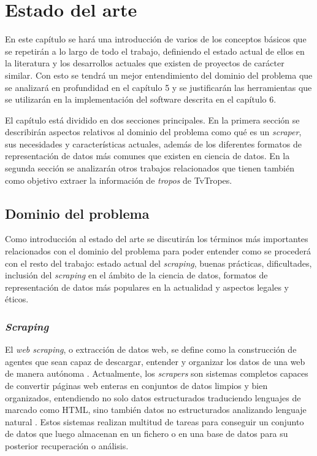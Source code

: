 \chapter{Estado del arte}
\label{chapter:3}

En este capítulo se hará una introducción de varios de los conceptos básicos que
se repetirán a lo largo de todo el trabajo, definiendo el estado actual de ellos
en la literatura y los desarrollos actuales que existen de proyectos de carácter
similar. Con esto se tendrá un mejor entendimiento del dominio del problema que
se analizará en profundidad en el capítulo 5 y se justificarán las herramientas
que se utilizarán en la implementación del software descrita en el capítulo 6.

El capítulo está dividido en dos secciones principales. En la primera sección se
describirán aspectos relativos al dominio del problema como qué es un
\textit{scraper}, sus necesidades y características actuales, además de los
diferentes formatos de representación de datos más comunes que existen en
ciencia de datos. En la segunda sección se analizarán otros trabajos
relacionados que tienen también como objetivo extraer la información de
\textit{tropos} de TvTropes. 

\section{Dominio del problema}
Como introducción al estado del arte se discutirán los términos más importantes
relacionados con el dominio del problema para poder entender como se procederá
con el resto del trabajo: estado actual del \textit{scraping}, buenas prácticas,
dificultades, inclusión del \textit{scraping} en el ámbito de la ciencia de
datos, formatos de representación de datos más populares en la actualidad y
aspectos legales y éticos.

\subsection{\textit{Scraping}}

El \textit{web scraping}, o extracción de datos web, se define como la
construcción de agentes que sean capaz de descargar, entender y organizar los
datos de una web de manera autónoma \cite{apress2018scraping}. Actualmente, los
\textit{scrapers} son sistemas completos capaces de convertir páginas web
enteras en conjuntos de datos limpios y bien organizados, entendiendo no solo
datos estructurados traduciendo lenguajes de marcado como HTML, sino también
datos no estructurados analizando lenguaje natural \cite{zhao2017web}. Estos
sistemas realizan multitud de tareas para conseguir un conjunto de datos que
luego almacenan en un fichero o en una base de datos para su posterior
recuperación o análisis.

